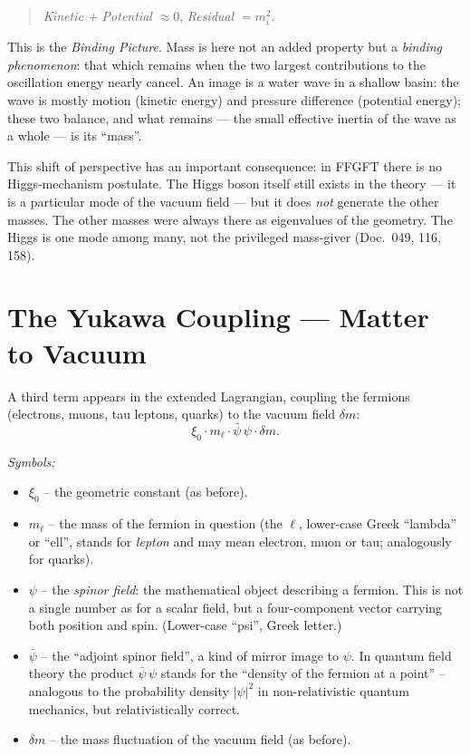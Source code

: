 \begin{quote}
\textit{Kinetic + Potential} $\approx 0$, \emph{Residual} $= m_i^2$.
\end{quote}

This is the \emph{Binding Picture}. Mass is here not an added
property but a \emph{binding phenomenon}: that which remains when
the two largest contributions to the oscillation energy nearly
cancel. An image is a water wave in a shallow basin: the wave is
mostly motion (kinetic energy) and pressure difference (potential
energy); these two balance, and what remains --- the small
effective inertia of the wave as a whole --- is its
\enquote{mass}.

This shift of perspective has an important consequence: in FFGFT
there is no Higgs-mechanism postulate. The Higgs boson itself still
exists in the theory --- it is a particular mode of the vacuum
field --- but it does \emph{not} generate the other masses. The
other masses were always there as eigenvalues of the geometry. The
Higgs is one mode among many, not the privileged mass-giver
(Doc.~049, 116, 158).

\section{The Yukawa Coupling --- Matter to Vacuum}

A third term appears in the extended Lagrangian, coupling the
fermions (electrons, muons, tau leptons, quarks) to the vacuum field
$\delta m$:
\[
  \xi_0 \cdot m_\ell \cdot \bar\psi\,\psi \cdot \delta m.
\]

\noindent\textit{Symbols:}
\begin{itemize}\setlength\itemsep{0pt}
  \item $\xi_0$ -- the geometric constant (as before).
  \item $m_\ell$ -- the mass of the fermion in question (the
        $\ell$, lower-case Greek \enquote{lambda} or \enquote{ell},
        stands for \emph{lepton} and may mean electron, muon or tau;
        analogously for quarks).
  \item $\psi$ -- the \emph{spinor field}: the mathematical object
        describing a fermion. This is not a single number as for a
        scalar field, but a four-component vector carrying both
        position and spin. (Lower-case \enquote{psi}, Greek letter.)
  \item $\bar\psi$ -- the \enquote{adjoint spinor field}, a kind of
        mirror image to $\psi$. In quantum field theory the product
        $\bar\psi\,\psi$ stands for the \enquote{density of the
        fermion at a point} -- analogous to the probability density
        $|\psi|^2$ in non-relativistic quantum mechanics, but
        relativistically correct.
  \item $\delta m$ -- the mass fluctuation of the vacuum field (as
        before).
\end{itemize}

